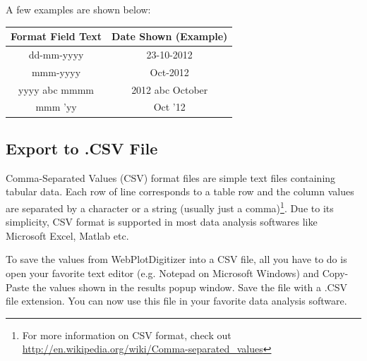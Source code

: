 \documentclass[letterpaper, 10pt]{article}
\begin{document}
A few examples are shown below:

\begin{center}
\begin{tabular}{|c|c|}
\hline
Format Field Text & Date Shown (Example)\\
\hline
dd-mm-yyyy & 23-10-2012\\
mmm-yyyy & Oct-2012\\
yyyy abc mmmm & 2012 abc October\\
mmm 'yy & Oct '12\\
\hline
\end{tabular}
\end{center}

\subsection{Export to .CSV File}
Comma-Separated Values (CSV) format files are simple text files containing tabular data. Each row of line corresponds to a table row and the column values are separated by a character or a string (usually just a comma)\footnote{For more information on CSV format, check out \url{http://en.wikipedia.org/wiki/Comma-separated_values}}. Due to its simplicity, CSV format is supported in most data analysis softwares like Microsoft Excel, Matlab etc.

To save the values from WebPlotDigitizer into a CSV file, all you have to do is open your favorite text editor (e.g. Notepad on Microsoft Windows) and Copy-Paste the values shown in the results popup window. Save the file with a .CSV file extension. You can now use this file in your favorite data analysis software.
\end{document}
